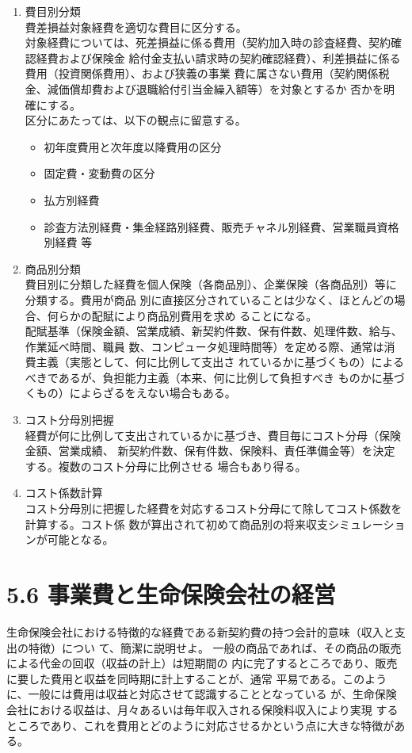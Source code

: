 \documentclass[report,gutter=10mm,fore-edge=10mm,uplatex,dvipdfmx]{jlreq}
\begin{document}
\begin{enumerate}[i]
\item[] 費目別分類\\
 費差損益対象経費を適切な費目に区分する。\\
 対象経費については、死差損益に係る費用（契約加入時の診査経費、契約確認経費および保険金
 給付金支払い請求時の契約確認経費）、利差損益に係る費用（投資関係費用）、および狭義の事業
 費に属さない費用（契約関係税金、減価償却費および退職給付引当金繰入額等）を対象とするか
 否かを明確にする。\\
 区分にあたっては、以下の観点に留意する。
\begin{itemize}
\item[] 初年度費用と次年度以降費用の区分
\item[] 固定費・変動費の区分
\item[] 払方別経費
\item[] 診査方法別経費・集金経路別経費、販売チャネル別経費、営業職員資格別経費 等
\end{itemize} 
\item[] 商品別分類\\
 費目別に分類した経費を個人保険（各商品別）、企業保険（各商品別）等に分類する。費用が商品
 別に直接区分されていることは少なく、ほとんどの場合、何らかの配賦により商品別費用を求め
 ることになる。\\
 配賦基準（保険金額、営業成績、新契約件数、保有件数、処理件数、給与、作業延べ時間、職員
 数、コンピュータ処理時間等）を定める際、通常は消費主義（実態として、何に比例して支出さ
 れているかに基づくもの）によるべきであるが、負担能力主義（本来、何に比例して負担すべき
 ものかに基づくもの）によらざるをえない場合もある。
\item[] コスト分母別把握\\
 経費が何に比例して支出されているかに基づき、費目毎にコスト分母（保険金額、営業成績、
 新契約件数、保有件数、保険料、責任準備金等）を決定する。複数のコスト分母に比例させる
 場合もあり得る。
\item[] コスト係数計算\\
 コスト分母別に把握した経費を対応するコスト分母にて除してコスト係数を計算する。コスト係
 数が算出されて初めて商品別の将来収支シミュレーションが可能となる。
\end{enumerate}

\section{5.6 事業費と生命保険会社の経営}
生命保険会社における特徴的な経費である新契約費の持つ会計的意味（収入と支出の特徴）につい
て、簡潔に説明せよ。
\answer{}
一般の商品であれば、その商品の販売による代金の回収（収益の計上）は短期間の
内に完了するところであり、販売に要した費用と収益を同時期に計上することが、通常
平易である。このように、一般には費用は収益と対応させて認識することとなっている
が、生命保険会社における収益は、月々あるいは毎年収入される保険料収入により実現
するところであり、これを費用とどのように対応させるかという点に大きな特徴がある。
\end{document}
